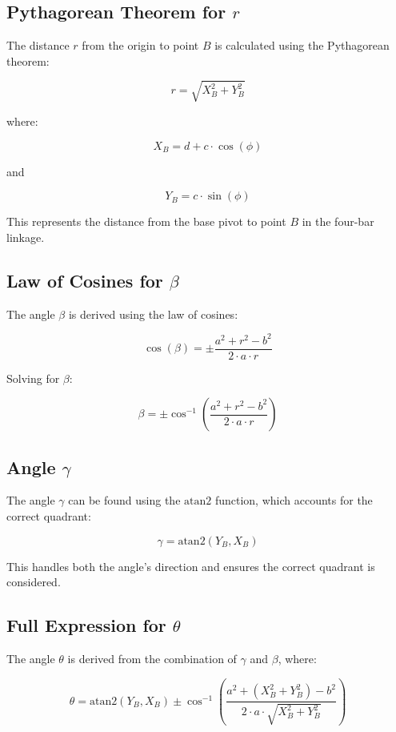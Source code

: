 \documentclass[12pt]{article}
\begin{document}
\subsection*{Pythagorean Theorem for \( r \)}

The distance \( r \) from the origin to point \( B \) is calculated using the Pythagorean theorem:

\[
r = \sqrt{X_B^2 + Y_B^2}
\]

where:

\[
X_B = d + c \cdot \cos(\phi)
\]

and

\[
Y_B = c \cdot \sin(\phi)
\]

This represents the distance from the base pivot to point \( B \) in the four-bar linkage.

\subsection*{Law of Cosines for \( \beta \)}

The angle \( \beta \) is derived using the law of cosines:

\[
\cos(\beta) = \pm\frac{a^2 + r^2 - b^2}{2 \cdot a \cdot r}
\]

Solving for \( \beta \):

\[
\beta = \pm\cos^{-1} \left(\frac{a^2 + r^2 - b^2}{2 \cdot a \cdot r} \right)
\]

\subsection*{Angle \( \gamma \)}

The angle \( \gamma \) can be found using the \( \text{atan2} \) function, which accounts for the correct quadrant:

\[
\gamma = \text{atan2}(Y_B, X_B)
\]

This handles both the angle's direction and ensures the correct quadrant is considered.

\subsection*{Full Expression for \( \theta \)}

The angle \( \theta \) is derived from the combination of \( \gamma \) and \( \beta \), where:

\[
\theta = \text{atan2}(Y_B, X_B) \pm \cos^{-1}\left( \frac{a^2 + \left(X_B^2 + Y_B^2\right) - b^2}{2 \cdot a \cdot \sqrt{X_B^2 + Y_B^2}} \right)
\]
\end{document}
